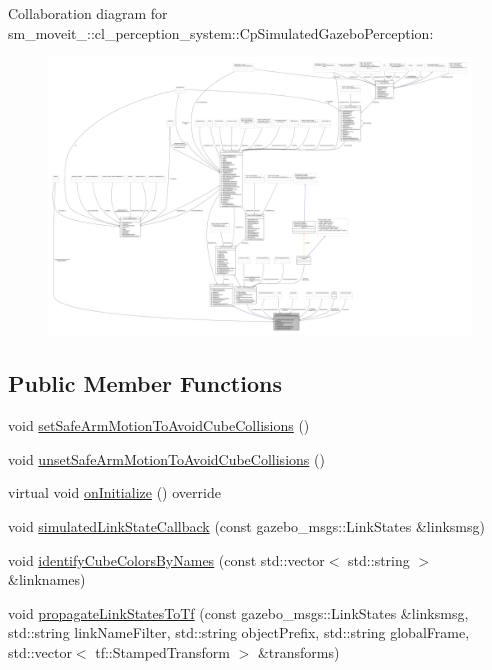 Collaboration diagram for sm\+\_\+moveit\+\_\+:\+:cl\+\_\+perception\+\_\+system\+:\+:Cp\+Simulated\+Gazebo\+Perception\+:
\nopagebreak
\begin{figure}[H]
\begin{center}
\leavevmode
\includegraphics[width=350pt]{classsm__moveit__4_1_1cl__perception__system_1_1CpSimulatedGazeboPerception__coll__graph}
\end{center}
\end{figure}
\subsection*{Public Member Functions}
\begin{DoxyCompactItemize}
\item 
void \hyperlink{classsm__moveit__4_1_1cl__perception__system_1_1CpSimulatedGazeboPerception_af42b5a4e239fcac98a222c34115c9bc0}{set\+Safe\+Arm\+Motion\+To\+Avoid\+Cube\+Collisions} ()
\item 
void \hyperlink{classsm__moveit__4_1_1cl__perception__system_1_1CpSimulatedGazeboPerception_a7f5d68f2ff7dd0ade9756058e790efa1}{unset\+Safe\+Arm\+Motion\+To\+Avoid\+Cube\+Collisions} ()
\item 
virtual void \hyperlink{classsm__moveit__4_1_1cl__perception__system_1_1CpSimulatedGazeboPerception_adebc30f6b1fc905f783de3f7bdf4a711}{on\+Initialize} () override
\item 
void \hyperlink{classsm__moveit__4_1_1cl__perception__system_1_1CpSimulatedGazeboPerception_a7914ffd20518c866a8a1e11254589d12}{simulated\+Link\+State\+Callback} (const gazebo\+\_\+msgs\+::\+Link\+States \&linksmsg)
\item 
void \hyperlink{classsm__moveit__4_1_1cl__perception__system_1_1CpSimulatedGazeboPerception_aac02fd742b0074f62d8909ce00a02d3b}{identify\+Cube\+Colors\+By\+Names} (const std\+::vector$<$ std\+::string $>$ \&linknames)
\item 
void \hyperlink{classsm__moveit__4_1_1cl__perception__system_1_1CpSimulatedGazeboPerception_a643fa78620216085ca385b74832a0abc}{propagate\+Link\+States\+To\+Tf} (const gazebo\+\_\+msgs\+::\+Link\+States \&linksmsg, std\+::string link\+Name\+Filter, std\+::string object\+Prefix, std\+::string global\+Frame, std\+::vector$<$ tf\+::\+Stamped\+Transform $>$ \&transforms)
\end{DoxyCompactItemize}
